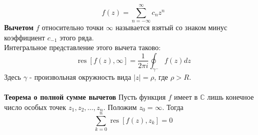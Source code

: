 \documentclass{article}
\begin{document}
	\begin{equation}
	f(z)=\sum_{n=-\infty}^{\infty} c_{n} z^{n}
	\end{equation}
	\textbf{Вычетом} $ f $ относительно точки $ \infty $ называется взятый со знаком минус коэффициент $ c_{-1} $ этого ряда.\\
	Интегральное представление этого вычета таково:
	\begin{equation}
	\operatorname{res}[f(z), \infty]=\frac{1}{2 \pi i} \oint_{\gamma^{-}} f(z) d z
	\end{equation}
	Здесь $ \gamma$ - произвольная окружность вида $ |z|=\rho$, где $\rho>R $.\\
	\\
	\textbf{Теорема о полной сумме вычетов} Пусть функция $ f $ имеет в $ \mathbb{C} $ лишь конечное число особых точек $ z_{1}, z_{2}, \ldots, z_{n} $. Положим $ z_{0}=\infty $. Тогда
	\begin{equation}
	\sum_{k=0}^{n} \operatorname{res}\left[f(z), z_{k}\right]=0
	\end{equation}
\end{document}
